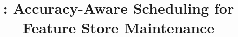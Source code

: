 


\newcommand\vldbdoi{10.14778/3632093.3632116}
\newcommand\vldbpages{563-576}
\newcommand\vldbvolume{17}
\newcommand\vldbissue{3}
\newcommand\vldbyear{2023}
\newcommand\vldbauthors{\authors}
\newcommand\vldbtitle{\shorttitle} 
\newcommand\vldbavailabilityurl{https://github.com/feature-store/ralf}
\newcommand\vldbpagestyle{empty} 



%
\title{\system{}: Accuracy-Aware Scheduling for Feature Store Maintenance}
%
%
%
%
%
%
%
%
%


